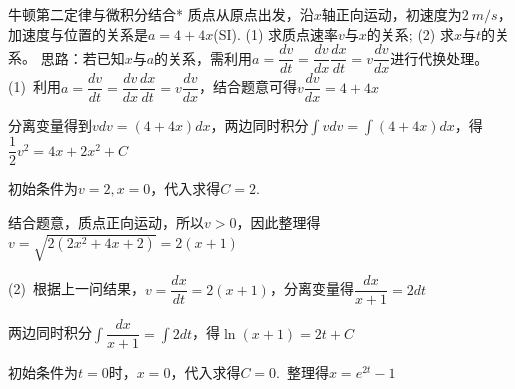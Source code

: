 




\begin{example}{牛顿第二定律与微积分结合*}
    质点从原点出发，沿$x$轴正向运动，初速度为$\SI{2}{m/s}$，加速度与位置的关系是$a=4+4x$(SI). (1) 求质点速率$v$与$x$的关系; (2) 求$x$与$t$的关系。
    \tcblower
    {\fangsong 思路：若已知$x$与$a$的关系，需利用$a=\dfrac{dv}{dt}=\dfrac{dv}{dx}\dfrac{dx}{dt}=v\dfrac{dv}{dx}$进行代换处理。}
    \tcbline
    (1)~利用$a=\dfrac{dv}{dt}=\dfrac{dv}{dx}\dfrac{dx}{dt}=v\dfrac{dv}{dx}$，结合题意可得$v\dfrac{dv}{dx}=4+4x$

    \vspace{0.5em}
    
    分离变量得到$vdv=(4+4x)dx$，两边同时积分$\int{vdv}=\int{(4+4x)dx}$，得$\dfrac{1}{2}v^2=4x+2x^2+C$

    \vspace{0.25em}

    初始条件为$v=2,x=0$，代入求得$C=2$.
    
    结合题意，质点正向运动，所以$v>0$，因此整理得$v=\sqrt{2(2x^2+4x+2)}=2(x+1)$

    \vspace{0.25em}

    (2)~根据上一问结果，$v=\dfrac{dx}{dt}=2(x+1)$，分离变量得$\dfrac{dx}{x+1}=2dt$

    \vspace{0.5em}

    两边同时积分$\int{\dfrac{dx}{x+1}}=\int{2dt}$，得$\ln{(x+1)}=2t+C$

    \vspace{0.25em}

    初始条件为$t=0$时，$x=0$，代入求得$C=0$.~整理得$x=e^{2t}-1$
    
\end{example}

